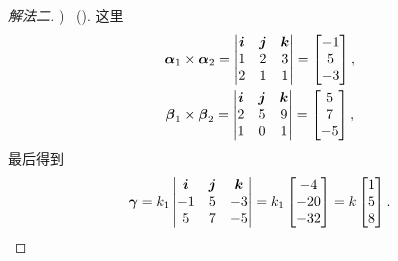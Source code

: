 \begin{example}
\begin{solution}
\begin{proof}[解法二]
)
\ ()\).
这里\begin{gather*}
	\boldsymbol\alpha_1\times\boldsymbol\alpha_2
	= \begin{vmatrix}
		\boldsymbol{i} & \boldsymbol{j} & \boldsymbol{k} \\
		1 & 2 & 3 \\
		2 & 1 & 1
	\end{vmatrix}
	= \begin{bmatrix}
		-1 \\
		5 \\
		-3
	\end{bmatrix}, \\
	\boldsymbol\beta_1\times\boldsymbol\beta_2
	= \begin{vmatrix}
		\boldsymbol{i} & \boldsymbol{j} & \boldsymbol{k} \\
		2 & 5 & 9 \\
		1 & 0 & 1
	\end{vmatrix}
	= \begin{bmatrix}
		5 \\
		7 \\
		-5
	\end{bmatrix},
\end{gather*}
最后得到\begin{equation*}
	\boldsymbol\gamma
	= k_1 \begin{vmatrix}
		\boldsymbol{i} & \boldsymbol{j} & \boldsymbol{k} \\
		-1 & 5 & -3 \\
		5 & 7 & -5
	\end{vmatrix}
	= k_1 \begin{bmatrix}
		-4 \\
		-20 \\
		-32
	\end{bmatrix}
	= k \begin{bmatrix}
		1 \\ 5 \\ 8
	\end{bmatrix}.
\end{equation*}
\end{proof}
\end{solution}
\end{example}

